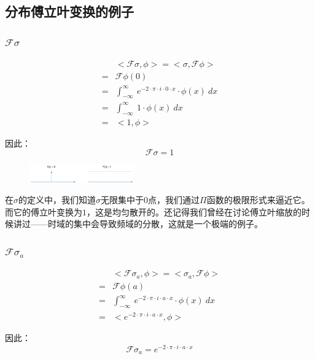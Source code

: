\subsection{分布傅立叶变换的例子}
\subsubsection{$\mathcal{F}\sigma$}
\begin{align*}
	  & <\mathcal{F}\sigma,\phi>  =  <\sigma,\mathcal{F}\phi>                          \\
	= & \mathcal{F}\phi(0)                                                             \\
	= & \int_{-\infty}^{\infty}\ e^{-2\cdot \pi\cdot i\cdot 0\cdot x}\cdot \phi(x)\ dx \\
	= & \int_{-\infty}^{\infty}\ 1\cdot \phi(x)\ dx                                    \\
	= & <1,\phi>
\end{align*}

因此：
\begin{equation}
	\mathcal{F}\sigma=1
\end{equation}
\begin{figure}[H]
	\centering
	\includegraphics[width=0.4\textwidth]{assets/fdelta.png}
\end{figure}
在$\sigma$的定义中，我们知道$\sigma$无限集中于$0$点，我们通过$\Pi$函数的极限形式来逼近它。而它的傅立叶变换为$1$，这是均匀散开的。还记得我们曾经在讨论傅立叶缩放的时候讲过——时域的集中会导致频域的分散，这就是一个极端的例子。
\subsubsection{$\mathcal{F}\sigma_a$}
\begin{align*}
	  & <\mathcal{F}\sigma_a,\phi>  =  <\sigma_a,\mathcal{F}\phi>                      \\
	= & \mathcal{F}\phi(a)                                                             \\
	= & \int_{-\infty}^{\infty}\ e^{-2\cdot \pi\cdot i\cdot a\cdot x}\cdot \phi(x)\ dx \\
	= & <e^{-2\cdot \pi\cdot i\cdot a\cdot x},\phi>
\end{align*}

因此：
\begin{equation}
	\mathcal{F}\sigma_a=e^{-2\cdot \pi\cdot i\cdot a\cdot x}
\end{equation}

